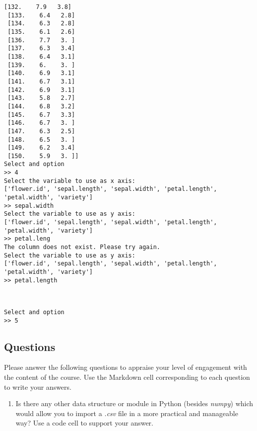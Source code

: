 \documentclass[11pt]{article}
\providecommand{\tightlist}{%
      \setlength{\itemsep}{0pt}\setlength{\parskip}{0pt}}
\begin{document}
\begin{Verbatim}[commandchars=\\\{\}]
 [132.    7.9   3.8]
 [133.    6.4   2.8]
 [134.    6.3   2.8]
 [135.    6.1   2.6]
 [136.    7.7   3. ]
 [137.    6.3   3.4]
 [138.    6.4   3.1]
 [139.    6.    3. ]
 [140.    6.9   3.1]
 [141.    6.7   3.1]
 [142.    6.9   3.1]
 [143.    5.8   2.7]
 [144.    6.8   3.2]
 [145.    6.7   3.3]
 [146.    6.7   3. ]
 [147.    6.3   2.5]
 [148.    6.5   3. ]
 [149.    6.2   3.4]
 [150.    5.9   3. ]]
Select and option
>> 4
Select the variable to use as x axis:
['flower.id', 'sepal.length', 'sepal.width', 'petal.length', 'petal.width', 'variety']
>> sepal.width
Select the variable to use as y axis:
['flower.id', 'sepal.length', 'sepal.width', 'petal.length', 'petal.width', 'variety']
>> petal.leng
The column does not exist. Please try again.
Select the variable to use as y axis:
['flower.id', 'sepal.length', 'sepal.width', 'petal.length', 'petal.width', 'variety']
>> petal.length

    \end{Verbatim}

    \begin{center}
    \end{center}
    { \hspace*{\fill} \\}
    
    \begin{Verbatim}[commandchars=\\\{\}]
Select and option
>> 5

    \end{Verbatim}

    \hypertarget{questions}{%
\subsection{Questions}\label{questions}}

Please answer the following questions to appraise your level of
engagement with the content of the course. Use the Markdown cell
corresponding to each question to write your answers.

    \begin{enumerate}
\def\labelenumi{\arabic{enumi}.}
\tightlist
\item
  Is there any other data structure or module in Python (besides
  \emph{numpy}) which would allow you to import a \emph{.csv} file in a
  more practical and manageable way? Use a code cell to support your
  answer.
\end{enumerate}
\end{document}
